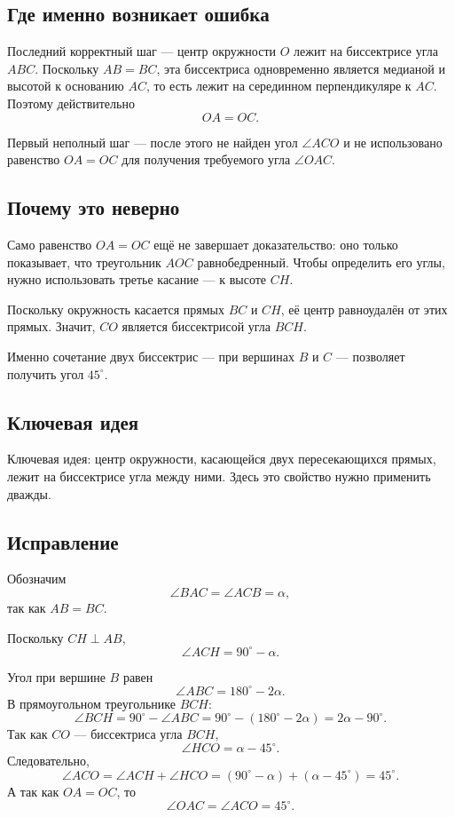 \documentclass[12pt,a4paper]{article}
\begin{document}
\subsection*{Где именно возникает ошибка}
Последний корректный шаг --- центр окружности $O$ лежит на биссектрисе угла $ABC$. Поскольку $AB=BC$, эта биссектриса одновременно является медианой и высотой к основанию $AC$, то есть лежит на серединном перпендикуляре к $AC$. Поэтому действительно
\[
OA=OC.
\]

Первый неполный шаг --- после этого не найден угол $\angle ACO$ и не использовано равенство $OA=OC$ для получения требуемого угла $\angle OAC$.

\subsection*{Почему это неверно}
Само равенство $OA=OC$ ещё не завершает доказательство: оно только показывает, что треугольник $AOC$ равнобедренный. Чтобы определить его углы, нужно использовать третье касание --- к высоте $CH$.

Поскольку окружность касается прямых $BC$ и $CH$, её центр равноудалён от этих прямых. Значит, $CO$ является биссектрисой угла $BCH$.

Именно сочетание двух биссектрис --- при вершинах $B$ и $C$ --- позволяет получить угол $45^\circ$.

\subsection*{Ключевая идея}
\textcolor{blue!60!black}{Ключевая идея:} центр окружности, касающейся двух пересекающихся прямых, лежит на биссектрисе угла между ними. Здесь это свойство нужно применить дважды.

\subsection*{Исправление}
Обозначим
\[
\angle BAC=\angle ACB=\alpha,
\]
так как $AB=BC$.

Поскольку $CH\perp AB$,
\[
\angle ACH=90^\circ-\alpha.
\]

Угол при вершине $B$ равен
\[
\angle ABC=180^\circ-2\alpha.
\]
В прямоугольном треугольнике $BCH$:
\[
\angle BCH=90^\circ-\angle ABC
=90^\circ-(180^\circ-2\alpha)
=2\alpha-90^\circ.
\]
Так как $CO$ --- биссектриса угла $BCH$,
\[
\angle HCO=\alpha-45^\circ.
\]
Следовательно,
\[
\angle ACO
=
\angle ACH+\angle HCO
=
(90^\circ-\alpha)+(\alpha-45^\circ)
=
45^\circ.
\]
А так как $OA=OC$, то
\[
\angle OAC=\angle ACO=45^\circ.
\]
\end{document}

